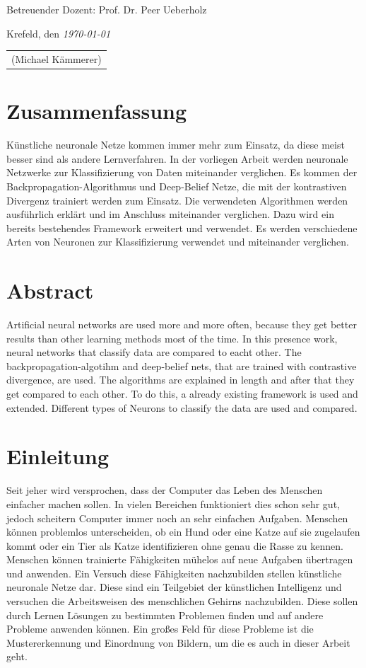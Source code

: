 \documentclass[12pt]{article}
\begin{document}
Betreuender Dozent:  Prof. Dr. Peer Ueberholz

Krefeld, den {\em \today}

\begin{tabular}{l}
\\
\\
\hline
(Michael Kämmerer)\\
\end{tabular}
\newpage
\section*{Zusammenfassung}

Künstliche neuronale Netze kommen immer mehr zum Einsatz, da diese meist besser sind als andere Lernverfahren. In der vorliegen Arbeit werden neuronale Netzwerke zur Klassifizierung von Daten miteinander verglichen. Es kommen der Backpropagation-Algorithmus und Deep-Belief Netze, die mit der kontrastiven Divergenz trainiert werden zum Einsatz. Die verwendeten Algorithmen werden ausführlich erklärt und im Anschluss miteinander verglichen. Dazu wird ein bereits bestehendes Framework erweitert und verwendet. Es werden verschiedene Arten von Neuronen zur Klassifizierung verwendet und miteinander verglichen. 

\section*{Abstract}
Artificial neural networks are used more and more often, because they get better results than other learning methods most of the time. In this presence work, neural networks that classify data are compared to eacht other. The backpropagation-algotihm and deep-belief nets, that are trained with contrastive divergence, are used. The algorithms are explained in length and after that they get compared to each other. To do this, a already existing framework is used and extended. Different types of Neurons to classify the data are used and compared. 

\newpage
{}

	\tableofcontents
	
	\newpage
	\section{Einleitung}
	Seit jeher wird versprochen, dass der Computer das Leben des Menschen einfacher machen sollen. In vielen Bereichen funktioniert dies schon sehr gut, jedoch scheitern Computer immer noch an sehr einfachen Aufgaben. Menschen können problemlos unterscheiden, ob ein Hund oder eine Katze auf sie zugelaufen kommt oder ein Tier als Katze identifizieren ohne genau die Rasse zu kennen. Menschen können trainierte Fähigkeiten mühelos auf neue Aufgaben übertragen und anwenden.
	Ein Versuch diese Fähigkeiten nachzubilden stellen künstliche neuronale Netze dar. Diese sind ein Teilgebiet der künstlichen Intelligenz und versuchen die Arbeitsweisen des menschlichen Gehirns nachzubilden. Diese sollen durch Lernen Lösungen zu bestimmten Problemen finden und auf andere Probleme anwenden können. Ein großes Feld für diese Probleme ist die Mustererkennung und Einordnung von Bildern, um die es auch in dieser Arbeit geht. 
	
\end{document}
